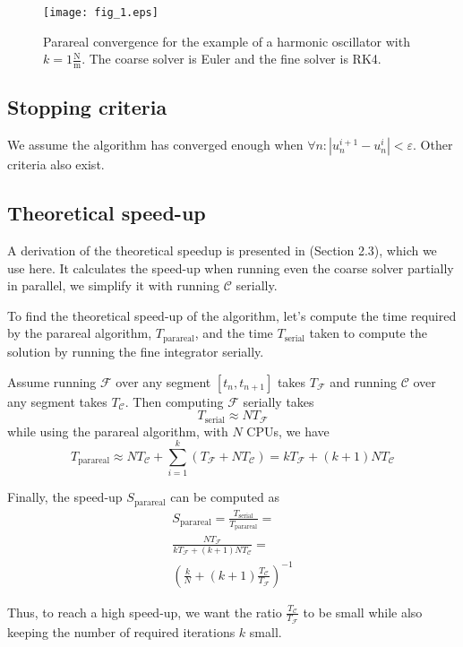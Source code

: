 \documentclass[conference]{IEEEtran}
\begin{document}
\begin{figure}[htbp]
\centerline{\texttt{[image: fig\_1.eps]}}
\caption{Parareal convergence for the example of a harmonic oscillator with $k = 1\frac{\text{N}}{\text{m}}$. The coarse solver is Euler and the fine solver is RK4.}
\label{oscillator}
\end{figure}

\subsection*{Stopping criteria}
We assume the algorithm has converged enough when $\forall n: |u^{i+1}_n - u^i_n| < \varepsilon$. Other criteria also exist.\cite{speedup}

\subsection*{Theoretical speed-up}

A derivation of the theoretical speedup is presented in \cite{speedup} (Section 2.3), which we use here. It calculates the speed-up when running even the coarse solver partially in parallel, we simplify it with running $\mathcal{C}$ serially. 

To find the theoretical speed-up of the algorithm, let's compute the time required by the parareal algorithm, $T_\text{parareal}$, and the time $T_\text{serial}$ taken to compute the solution by running the fine integrator serially. 

Assume running $\mathcal{F}$ over any segment $[t_n, t_{n+1}]$ takes $T_\mathcal{F}$ and running $\mathcal{C}$ over any segment takes $T_\mathcal{C}$. Then computing $\mathcal{F}$ serially takes
$$
T_\text{serial} \approx NT_\mathcal{F}
$$
while using the parareal algorithm, with $N$ CPUs, we have
$$
T_\text{parareal} \approx NT_\mathcal{C} + \sum_{i=1}^{k}\left(T_\mathcal{F} + NT_\mathcal{C}\right) = kT_\mathcal{F} + (k+1)NT_\mathcal{C}
$$

Finally, the speed-up $S_\text{parareal}$ can be computed as
\begin{multline}
S_\text{parareal} = \frac{T_\text{serial}}{T_\text{parareal}} = \\\frac{NT_\mathcal{F}}{kT_\mathcal{F} + (k+1)NT_\mathcal{C}} = \\\left(\frac{k}{N} + (k+1)\frac{T_\mathcal{C}}{T_\mathcal{F}}\right)^{-1}
\end{multline}

Thus, to reach a high speed-up, we want the ratio $\frac{T_\mathcal{C}}{T_\mathcal{F}}$ to be small while also keeping the number of required iterations $k$ small.\cite{speedup}
\end{document}
